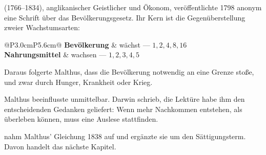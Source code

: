 \begin{geschichte}
 (1766--1834), anglikanischer Geistlicher und Ökonom, veröffentlichte 1798 anonym eine Schrift über das Bevölkerungsgesetz. Ihr Kern ist die Gegenüberstellung zweier Wachstumsarten:

\begin{center}
\renewcommand{\arraystretch}{1.5}
\begin{tabular}{@{}P{3.0cm}P{5.6cm}@{}}
\toprule
\textbf{Bevölkerung} & wächst  --- $1, 2, 4, 8, 16$\\
\textbf{Nahrungs\-mittel} & wachsen  --- $1, 2, 3, 4, 5$\\
\bottomrule
\end{tabular}
\end{center}

Daraus folgerte Malthus, dass die Bevölkerung notwendig an eine Grenze stoße, und zwar durch Hunger, Krankheit oder Krieg.

\begin{center}
\begin{minipage}{0.9\textwidth}
\end{minipage}
\end{center}

Malthus beeinflusste  unmittelbar. Darwin schrieb, die Lektüre habe ihm den entscheidenden Gedanken geliefert: Wenn mehr Nachkommen entstehen, als überleben können, muss eine Auslese stattfinden.

\begin{center}
\begin{minipage}{0.9\textwidth}
\end{minipage}
\end{center}

 nahm Malthus' Gleichung 1838 auf und ergänzte sie um den Sättigungsterm. Davon handelt das nächste Kapitel.
\end{geschichte}

